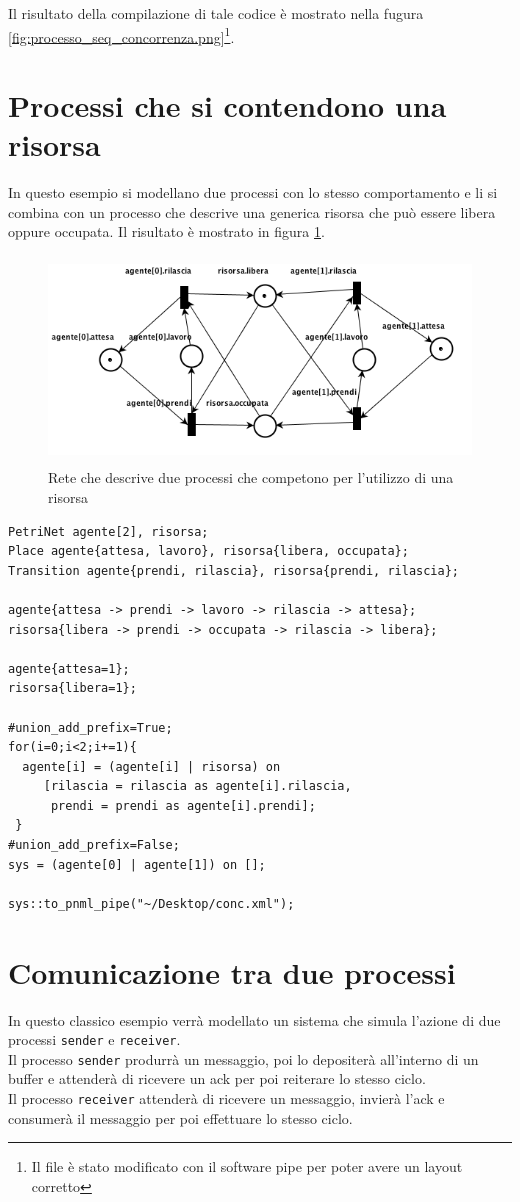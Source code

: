 \documentclass[italian,12pt]{book}
\begin{document}
Il risultato della compilazione di tale codice è mostrato nella fugura \ref{fig:processo_seq_concorrenza.png}\footnote{Il file è stato modificato con il software pipe per poter avere un layout corretto}.

\section{Processi che si contendono una risorsa}
In questo esempio si modellano due processi con lo stesso comportamento e li si combina con un processo che descrive una generica risorsa che può essere libera oppure occupata. Il risultato è mostrato in figura \ref{fig:processi_concorrenti_su_risorsa.png}.
\begin{figure}[htb]
\centerline{\includegraphics[height=5.5cm]{img/processi_concorrenti_su_risorsa.png}}
\caption{Rete che descrive due processi che competono per l'utilizzo di una risorsa}\label{fig:processi_concorrenti_su_risorsa.png}
\end{figure}

\begin{verbatim}PetriNet agente[2], risorsa;
Place agente{attesa, lavoro}, risorsa{libera, occupata};
Transition agente{prendi, rilascia}, risorsa{prendi, rilascia};

agente{attesa -> prendi -> lavoro -> rilascia -> attesa};
risorsa{libera -> prendi -> occupata -> rilascia -> libera};

agente{attesa=1};
risorsa{libera=1};

#union_add_prefix=True;
for(i=0;i<2;i+=1){
  agente[i] = (agente[i] | risorsa) on 
     [rilascia = rilascia as agente[i].rilascia, 
      prendi = prendi as agente[i].prendi];
 }
#union_add_prefix=False;
sys = (agente[0] | agente[1]) on [];

sys::to_pnml_pipe("~/Desktop/conc.xml");
\end{verbatim}

\section{Comunicazione tra due processi}
In questo classico esempio verrà modellato un sistema che simula l'azione di due processi {\tt sender} e {\tt receiver}.\\
Il processo {\tt sender} produrrà un messaggio, poi lo depositerà all'interno di un buffer e attenderà di ricevere un ack per poi reiterare lo stesso ciclo.\\
Il processo {\tt receiver} attenderà di ricevere un messaggio, invierà l'ack e consumerà il messaggio per poi effettuare lo stesso ciclo.\\
\end{document}
